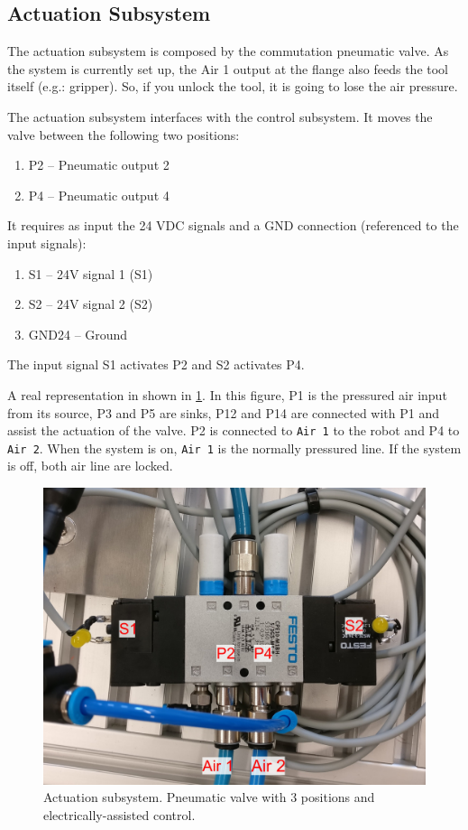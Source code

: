 \documentclass[twoside,a4paper]{refart}
\begin{document}
\subsection{Actuation Subsystem}\label{sub:actuation_system}
The actuation subsystem is composed by the commutation pneumatic valve. As the system is currently set up, the Air 1 output at the flange also feeds the tool itself (e.g.: gripper). So, if you unlock the tool, it is going to lose the air pressure.

The actuation subsystem interfaces with the control subsystem. It moves the valve between the following two positions:

\begin{enumerate}
	\item
	P2 -- Pneumatic output 2
	\item
	P4 -- Pneumatic output 4 
\end{enumerate}

It requires as input the 24 VDC signals and a GND connection (referenced to the input signals):
\begin{enumerate}
	\item
	S1 -- 24V signal 1 (S1)
	\item
	S2 -- 24V signal 2 (S2)
	\item
	GND24 -- Ground
\end{enumerate}
The input signal S1 activates P2 and S2 activates P4.

A real representation in shown in \cref{fig:ph_actuation}. In this figure, P1 is the pressured air input from its source, P3 and P5 are sinks, P12 and P14 are connected with P1 and assist the actuation of the valve. P2 is connected to {\tt Air 1} to the robot and P4 to {\tt Air 2}. When the system is on, {\tt Air 1} is the normally pressured line. If the system is off, both air line are locked.

\begin{figure}[H]
	\centering
	\includegraphics[width=1.0\linewidth]{ph_actuation}
	\caption{Actuation subsystem. Pneumatic valve with 3 positions and electrically-assisted control.}
	\label{fig:ph_actuation}
\end{figure}
\end{document}
